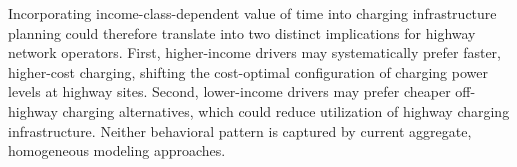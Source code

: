 Incorporating income-class-dependent value of time into charging infrastructure planning could therefore translate into two distinct implications for highway network operators. First, higher-income drivers may systematically prefer faster, higher-cost charging, shifting the cost-optimal configuration of charging power levels at highway sites. Second, lower-income drivers may prefer cheaper off-highway charging alternatives, which could reduce utilization of highway charging infrastructure. Neither behavioral pattern is captured by current aggregate, homogeneous modeling approaches.


